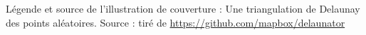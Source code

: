\thispagestyle{empty}
\vspace*{500pt} %
Légende et source de l'illustration de couverture : Une triangulation de Delaunay des points aléatoires. Source : tiré de \href{https://github.com/mapbox/delaunator}{https://github.com/mapbox/delaunator}